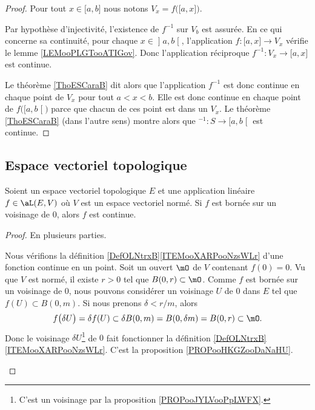 \begin{proof}
	Pour tout \( x\in \mathopen[ a , b \mathclose]\) nous notons \( V_x=f\big( \mathopen[ a , x \mathclose] \big)\).

	Par hypothèse d'injectivité, l'existence de \( f^{-1}\) sur \( V_b\) est assurée. En ce qui concerne sa continuité, pour chaque \( x\in\mathopen] a , b \mathclose[\), l'application \( f\colon \mathopen[ a , x \mathclose]\to V_x\) vérifie le lemme \ref{LEMooPLGTooATIGov}. Donc l'application réciproque \( f^{-1}\colon V_x\to \mathopen[ a , x \mathclose]\) est continue.

	Le théorème \ref{ThoESCaraB} dit alors que l'application \( f^{-1}\) est donc continue en chaque point de \( V_x \) pour tout \( a<x<b\). Elle est donc continue en chaque point de \( f\big( \mathopen[ a , b \mathclose[ \big)\) parce que chacun de ces point est dans un \( V_x\). Le théorème \ref{ThoESCaraB}  (dans l'autre sens) montre alors que \( ^{-1}\colon S\to \mathopen[ a , b \mathclose[\) est continue.
\end{proof}


\subsection{Espace vectoriel topologique}

\begin{proposition}	\label{PROPooHUWQooPWYBUu}
	Soient un espace vectoriel topologique \( E\) et une application linéaire \( f\in\aL(E,V)\) où \( V\) est un espace vectoriel normé. Si \( f\) est bornée sur un voisinage de \( 0\), alors \( f\) est continue.
\end{proposition}

\begin{proof}
	En plusieurs parties.
	\begin{subproof}
		Nous vérifions la définition \ref{DefOLNtrxB}\ref{ITEMooXARPooNzsWLr} d'une fonction continue en un point. Soit un ouvert \( \mO\) de \( V\) contenant \( f(0)=0\). Vu que \( V\) est normé, il existe \( r>0\) tel que \( B(0,r)\subset\mO\). Comme \( f\) est bornée sur un voisinage de \( 0\), nous pouvons considérer un voisinage \( U\) de \( 0\) dans \( E\) tel que \( f(U)\subset B(0,m)\). Si nous prenons \(\delta<r/m\), alors
		\begin{equation}
			f\big( \delta U \big)=\delta f(U)\subset \delta B(0,m)=B(0,\delta m)=B(0,r)\subset \mO.
		\end{equation}
		Donc le voisinage \( \delta U\)\footnote{C'est un voisinage par la proposition \ref{PROPooJYLVooPpLWFX}.} de \( 0\) fait fonctionner la définition \ref{DefOLNtrxB}\ref{ITEMooXARPooNzsWLr}.
		C'est la proposition \ref{PROPooHKGZooDaNaHU}.
	\end{subproof}
\end{proof}
